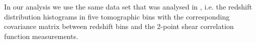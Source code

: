 \documentclass{aa}
\begin{document}
In our analysis we use the same data set that was analysed in \cite{hildebrandt18}, i.e. the redshift distribution histograms in five tomographic bins with the corresponding covariance matrix between redshift bins and the 2-point shear correlation function measurements.

\end{document}

